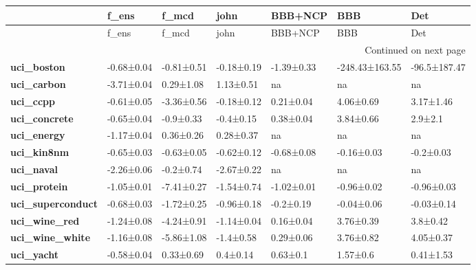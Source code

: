\addtocounter{table}{-1}
\begin{longtable}[l]{lllllll}
\toprule
{} &       f\_ens &       f\_mcd &        john &     BBB+NCP &             BBB &           Det \\
\midrule
\endfirsthead

\toprule
{} &       f\_ens &       f\_mcd &        john &     BBB+NCP &             BBB &           Det \\
\midrule
\endhead
\midrule
\multicolumn{7}{r}{{Continued on next page}} \\
\midrule
\endfoot

\bottomrule
\endlastfoot
\textbf{uci\_boston      } &  -0.68±0.04 &  -0.81±0.51 &  -0.18±0.19 &  -1.39±0.33 &  -248.43±163.55 &  -96.5±187.47 \\
\textbf{uci\_carbon      } &  -3.71±0.04 &   0.29±1.08 &   1.13±0.51 &          na &              na &            na \\
\textbf{uci\_ccpp        } &  -0.61±0.05 &  -3.36±0.56 &  -0.18±0.12 &   0.21±0.04 &       4.06±0.69 &     3.17±1.46 \\
\textbf{uci\_concrete    } &  -0.65±0.04 &   -0.9±0.33 &   -0.4±0.15 &   0.38±0.04 &       3.84±0.66 &       2.9±2.1 \\
\textbf{uci\_energy      } &  -1.17±0.04 &   0.36±0.26 &   0.28±0.37 &          na &              na &            na \\
\textbf{uci\_kin8nm      } &  -0.65±0.03 &  -0.63±0.05 &  -0.62±0.12 &  -0.68±0.08 &      -0.16±0.03 &     -0.2±0.03 \\
\textbf{uci\_naval       } &  -2.26±0.06 &   -0.2±0.74 &  -2.67±0.22 &          na &              na &            na \\
\textbf{uci\_protein     } &  -1.05±0.01 &  -7.41±0.27 &  -1.54±0.74 &  -1.02±0.01 &      -0.96±0.02 &    -0.96±0.03 \\
\textbf{uci\_superconduct} &  -0.68±0.03 &  -1.72±0.25 &  -0.96±0.18 &   -0.2±0.19 &      -0.04±0.06 &    -0.03±0.14 \\
\textbf{uci\_wine\_red    } &  -1.24±0.08 &  -4.24±0.91 &  -1.14±0.04 &   0.16±0.04 &       3.76±0.39 &      3.8±0.42 \\
\textbf{uci\_wine\_white  } &  -1.16±0.08 &  -5.86±1.08 &   -1.4±0.58 &   0.29±0.06 &       3.76±0.82 &     4.05±0.37 \\
\textbf{uci\_yacht       } &  -0.58±0.04 &   0.33±0.69 &    0.4±0.14 &    0.63±0.1 &        1.57±0.6 &     0.41±1.53 \\
\end{longtable}

